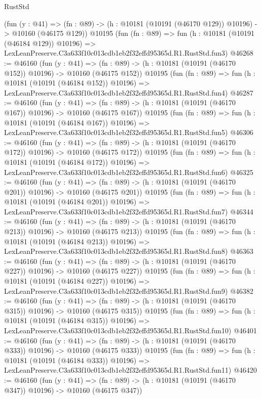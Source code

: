 \begin{lexlean}{RustStd}
\begin{coremodule}
    (fun (y : @41) =>
    (fn : @89) -> (h : @10181 (@10191 (@46170 @129)) @10196) -> @10160 (@46175 @129))
    @10195
    (fun (fn : @89) =>
    fun (h : @10181 (@10191 (@46184 @129)) @10196) =>
    LexLeanPreserve.C3a633f10c013cdb1eb2f32effd95365d.R1.RustStd.fun3)
@46268 := @46160
    (fun (y : @41) =>
    (fn : @89) -> (h : @10181 (@10191 (@46170 @152)) @10196) -> @10160 (@46175 @152))
    @10195
    (fun (fn : @89) =>
    fun (h : @10181 (@10191 (@46184 @152)) @10196) =>
    LexLeanPreserve.C3a633f10c013cdb1eb2f32effd95365d.R1.RustStd.fun4)
@46287 := @46160
    (fun (y : @41) =>
    (fn : @89) -> (h : @10181 (@10191 (@46170 @167)) @10196) -> @10160 (@46175 @167))
    @10195
    (fun (fn : @89) =>
    fun (h : @10181 (@10191 (@46184 @167)) @10196) =>
    LexLeanPreserve.C3a633f10c013cdb1eb2f32effd95365d.R1.RustStd.fun5)
@46306 := @46160
    (fun (y : @41) =>
    (fn : @89) -> (h : @10181 (@10191 (@46170 @172)) @10196) -> @10160 (@46175 @172))
    @10195
    (fun (fn : @89) =>
    fun (h : @10181 (@10191 (@46184 @172)) @10196) =>
    LexLeanPreserve.C3a633f10c013cdb1eb2f32effd95365d.R1.RustStd.fun6)
@46325 := @46160
    (fun (y : @41) =>
    (fn : @89) -> (h : @10181 (@10191 (@46170 @201)) @10196) -> @10160 (@46175 @201))
    @10195
    (fun (fn : @89) =>
    fun (h : @10181 (@10191 (@46184 @201)) @10196) =>
    LexLeanPreserve.C3a633f10c013cdb1eb2f32effd95365d.R1.RustStd.fun7)
@46344 := @46160
    (fun (y : @41) =>
    (fn : @89) -> (h : @10181 (@10191 (@46170 @213)) @10196) -> @10160 (@46175 @213))
    @10195
    (fun (fn : @89) =>
    fun (h : @10181 (@10191 (@46184 @213)) @10196) =>
    LexLeanPreserve.C3a633f10c013cdb1eb2f32effd95365d.R1.RustStd.fun8)
@46363 := @46160
    (fun (y : @41) =>
    (fn : @89) -> (h : @10181 (@10191 (@46170 @227)) @10196) -> @10160 (@46175 @227))
    @10195
    (fun (fn : @89) =>
    fun (h : @10181 (@10191 (@46184 @227)) @10196) =>
    LexLeanPreserve.C3a633f10c013cdb1eb2f32effd95365d.R1.RustStd.fun9)
@46382 := @46160
    (fun (y : @41) =>
    (fn : @89) -> (h : @10181 (@10191 (@46170 @315)) @10196) -> @10160 (@46175 @315))
    @10195
    (fun (fn : @89) =>
    fun (h : @10181 (@10191 (@46184 @315)) @10196) =>
    LexLeanPreserve.C3a633f10c013cdb1eb2f32effd95365d.R1.RustStd.fun10)
@46401 := @46160
    (fun (y : @41) =>
    (fn : @89) -> (h : @10181 (@10191 (@46170 @333)) @10196) -> @10160 (@46175 @333))
    @10195
    (fun (fn : @89) =>
    fun (h : @10181 (@10191 (@46184 @333)) @10196) =>
    LexLeanPreserve.C3a633f10c013cdb1eb2f32effd95365d.R1.RustStd.fun11)
@46420 := @46160
    (fun (y : @41) =>
    (fn : @89) -> (h : @10181 (@10191 (@46170 @347)) @10196) -> @10160 (@46175 @347))

\end{coremodule}
\end{lexlean}
